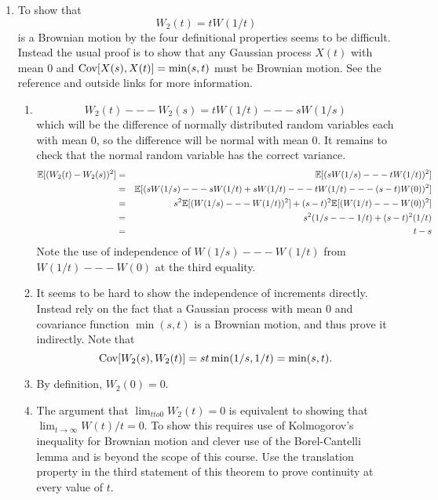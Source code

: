 {\begin{enumerate}
  \item
  To show that 
  \[
    W_2(t) = t W(1/t)
  \]
  is a Brownian motion by the four definitional properties
  seems to be difficult.  Instead the usual proof is to show
  that any Gaussian process $X(t)$ with mean $0$ and $\operatorname{Cov}[X(s),
  X(t)] = \min(s,t)$ must be Brownian motion. See the reference
  and outside links for more information.
  \begin{enumerate}
    \item
    \[
      W_2(t) --- W_2(s) = t W(1/t) --- s W(1/s)
    \]
    which will be the difference of normally distributed
    random variables each with mean $ 0 $, so the difference
    will be normal with mean $ 0 $.  It remains to check
    that the normal random variable has the correct
    variance.
    \begin{eqnarray*}
      \mathbb{E}[ (W_2(t)-W_2(s))^2] &=& \mathbb{E}[ (s W(1/s) --- t W(1/
      t))^2 ] \\
      &=& \mathbb{E}[ ( s W(1/s) --- s W(1/t) + s W(1/t) --- t W(1/t)
       --- (s -t) W(0) )^2 ] \\
      &=& s^2 \mathbb{E}[ (W(1/s) --- W(1/t))^2 ] + (s-t)^2 \mathbb{E}[
      (W(1/t) --- W(0))^2
      ] \\
      &=& s^2 ( 1/s --- 1/t ) + (s-t)^2 ( 1/t ) \\
      &=& t-s
    \end{eqnarray*}
    Note the use of independence of $ W(1/s) --- W(1/t) $
    from $ W(1/t) --- W(0) $ at the third equality.

    \item
    It seems to be hard to show the independence of
    increments directly.  Instead rely on the fact that a
    Gaussian process with mean $0$ and covariance function
    $\min(s,t)$ is a Brownian motion, and thus prove it indirectly.
    Note that
    \[
      \operatorname{Cov}[ W_2(s), W_2(t)] = st \min(1/s, 1/t) =
      \min(s,t).
    \]

    \item
    By definition, $ W_2(0) = 0 $.
    
    \item
    The argument that $ \lim_{t to 0} W_2(t) = 0 $ is
    equivalent to showing that $ \lim_{t \to \infty} W(t)/t
    = 0 $.  To show this requires use of Kolmogorov's
    inequality for Brownian motion and clever use of the
    Borel-Cantelli lemma and is beyond the scope of this
    course.  Use the translation property in the third
    statement of this theorem to prove continuity at every
    value of $ t $.
  \end{enumerate}


\end{enumerate}}
